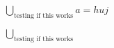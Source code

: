 \documentclass{article}
\begin{document}
$\displaystyle \bigcup_{\text{testing if this works}}a=huj$

$\bigcup_{\text{testing if this works}}$
\end{document}
